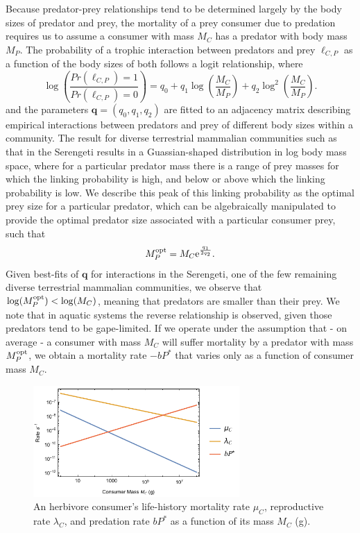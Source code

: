 \documentclass[onecolumn,preprintnumbers,amsmath,amssymb,superscriptaddress]{revtex4}
\begin{document}
Because predator-prey relationships tend to be determined largely by the body sizes of predator and prey, the mortality of a prey consumer due to predation requires us to assume a consumer with mass $M_C$ has a predator with body mass $M_P$.
The probability of a trophic interaction between predators and prey $\ell_{C,P}$ as a function of the body sizes of both follows a logit relationship, where
\begin{equation}
	\log \left(\frac{Pr(\ell_{C,P})=1}{Pr(\ell_{C,P})=0}\right) = q_0 + q_1 \log \left(\frac{M_C}{M_P}\right) + q_2 \log^2\left(\frac{M_C}{M_P}\right).
\end{equation}
and the parameters ${\bm q} = (q_0,q_1,q_2)$ are fitted to an adjacency matrix describing empirical interactions between predators and prey of different body sizes within a community. 
The result for diverse terrestrial mammalian communities such as that in the Serengeti results in a Guassian-shaped distribution in log body mass space, where for a particular predator mass there is a range of prey masses for which the linking probability is high, and below or above which the linking probability is low.
We describe this peak of this linking probability as the optimal prey size for a particular predator, which can be algebraically manipulated to provide the optimal predator size associated with a particular consumer prey, such that
\begin{equation}
	M_P^{\rm opt} = M_C {\rm e}^{\frac{q_1}{2 q_2}}.
	\label{eq:opt}
\end{equation}
Given best-fits of ${\bm q}$ for interactions in the Serengeti, one of the few remaining diverse terrestrial mammalian communities, we observe that $\log (M_P^{\rm opt}) < \log(M_C)$, meaning that predators are smaller than their prey.
We note that in aquatic systems the reverse relationship is observed, given those predators tend to be gape-limited.
If we operate under the assumption that - on average - a consumer with mass $M_C$ will suffer mortality by a predator with mass $M_P^{\rm opt}$, we obtain a mortality rate $-bP^*$ that varies only as a function of consumer mass $M_C$.

\begin{figure}
  \centering
  \includegraphics[width=0.7\textwidth]{../Figures/MortRateComparisonPlot.pdf}
  \caption{
	  An herbivore consumer's life-history mortality rate $\mu_C$, reproductive rate $\lambda_C$, and predation rate $bP^*$ as a function of its mass $M_C$ (g).
  }
  \label{fig:mortrate}
\end{figure}
\end{document}
